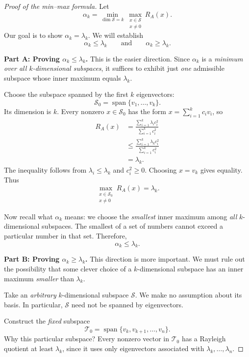 \documentclass[14pt,letterpaper]{article}
\theoremstyle{plain}
\theoremstyle{definition}
\theoremstyle{remark}
\DeclareMathOperator{\Span}{span}
\begin{document}
\begin{proof}[Proof of the min--max formula]
Let
\[
\boxed{
\alpha_k=
\min_{\dim\mathcal S=k}
\max_{\substack{x\in\mathcal S\\x\neq0}}R_A(x).
}
\]
Our goal is to show $\alpha_k=\lambda_k$.
We will establish
\[
\alpha_k\leq\lambda_k
\qquad\text{and}\qquad
\alpha_k\geq\lambda_k.
\]

\medskip
\noindent\textbf{Part A: Proving $\alpha_k\leq\lambda_k$.}\quad
This is the easier direction. Since $\alpha_k$ is
a \emph{minimum over all $k$-dimensional subspaces},
it suffices to exhibit just \emph{one} admissible
subspace whose inner maximum equals $\lambda_k$.

Choose the subspace spanned by the first $k$
eigenvectors:
\[
\boxed{\mathcal S_0=\Span\{v_1,\ldots,v_k\}.}
\]
Its dimension is $k$. Every nonzero $x\in\mathcal S_0$
has the form $x=\sum_{i=1}^k c_i v_i$, so
\[
\begin{aligned}
R_A(x)
&=\frac{\sum_{i=1}^k\lambda_i c_i^2}
         {\sum_{i=1}^k c_i^2}\\[3pt]
&\leq\frac{\sum_{i=1}^k\lambda_k c_i^2}
          {\sum_{i=1}^k c_i^2}\\[3pt]
&=\lambda_k.
\end{aligned}
\]
The inequality follows from $\lambda_i\leq\lambda_k$
and $c_i^2\geq0$. Choosing $x=v_k$ gives equality.
Thus
\[
\boxed{
\max_{\substack{x\in\mathcal S_0\\x\neq0}}
R_A(x)=\lambda_k.
}
\]

Now recall what $\alpha_k$ means: we choose the
\emph{smallest} inner maximum among \emph{all}
$k$-dimensional subspaces. The smallest of a set of
numbers cannot exceed a particular number in that
set. Therefore,
\[
\boxed{\alpha_k\leq\lambda_k.}
\]

\medskip
\noindent\textbf{Part B: Proving $\alpha_k\geq\lambda_k$.}\quad
This direction is more important. We must rule out
the possibility that some clever choice of a
$k$-dimensional subspace has an inner maximum
\emph{smaller} than $\lambda_k$.

Take an \emph{arbitrary} $k$-dimensional subspace
$\mathcal S$. We make no assumption about its basis.
In particular, $\mathcal S$ need not be spanned by
eigenvectors.

Construct the \emph{fixed} subspace
\[
\boxed{\mathcal T_0=\Span\{v_k,v_{k+1},\ldots,v_n\}.}
\]
Why this particular subspace? Every nonzero vector
in $\mathcal T_0$ has a Rayleigh quotient at least
$\lambda_k$, since it uses only eigenvectors
associated with $\lambda_k,\ldots,\lambda_n$.


\end{proof}
\end{document}
